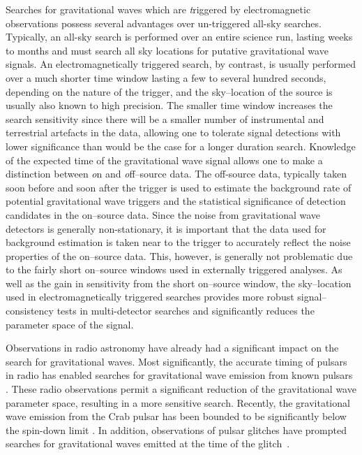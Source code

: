 \documentclass[epsf]{article}
\newcommand{\gws}{gravitational waves }
\begin{document}
Searches for \gws which are {\emph triggered} by electromagnetic observations possess
several advantages over un-triggered all-sky searches.  Typically, an all-sky
search is performed over an entire science run, lasting weeks to months and
must search all sky locations for putative gravitational wave signals. An
electromagnetically triggered search, by contrast, is usually performed
over a much shorter time window lasting a few to several hundred seconds,
depending on the nature of the trigger, and the sky--location of the source is
usually also known to high precision.  The smaller time window increases the search
sensitivity since there will be a smaller number of instrumental and terrestrial
artefacts in the data, allowing one to tolerate signal detections with lower
significance than would be the case for a longer duration search.  Knowledge of 
the expected time of the gravitational wave signal allows one to make a distinction
between {\emph on} and {\emph off--source} data.  The off-source data, typically
taken soon before and soon after the trigger is used to estimate the background
rate of potential gravitational wave triggers and the statistical significance
of detection candidates in the on--source data.   Since the noise from
gravitational wave detectors is generally non-stationary, it is important that
the data used for background estimation is taken near to the trigger to accurately
reflect the noise properties of the on--source data.  This, however, is
generally not problematic due to the fairly short on--source windows used in
externally triggered analyses.  As well as the gain in sensitivity from the short
on--source window, the sky--location used in electromagnetically triggered
searches provides more robust signal--consistency tests in multi-detector searches
and significantly reduces the parameter space of the signal.

Observations in radio astronomy have already had a significant impact on
the search for gravitational waves.  Most significantly, the accurate
timing of pulsars in radio has enabled searches for gravitational wave
emission from known pulsars \cite{known_pulsars}.  These radio
observations permit a significant reduction of the gravitational wave
parameter space, resulting in a more sensitive search.
Recently, the gravitational wave emission from the Crab pulsar has been
bounded to be significantly below the spin-down limit \cite{crab}.  In
addition, observations of pulsar glitches \cite{Flanagan:2006,Buchner:2008} have prompted
searches for gravitational waves emitted at the time of the glitch~\cite{Clark:2007}.
\end{document}
